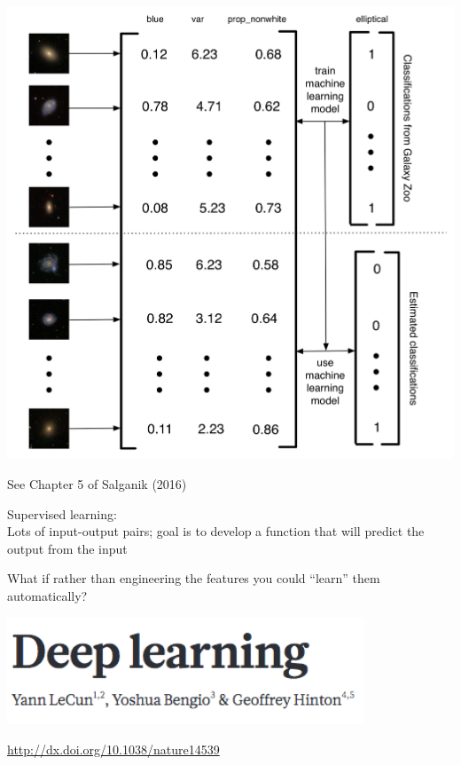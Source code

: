 \documentclass[aspectratio=169]{beamer}
\begin{document}
\begin{frame}

\begin{center}
\includegraphics[height=0.9\textheight]{figures/gz_banerji_schematic}
\end{center}
\vfill
See Chapter 5 of Salganik (2016)
\end{frame}
\begin{frame}

Supervised learning:\\
Lots of input-output pairs; goal is to develop a function that will predict the output from the input

\end{frame}
\begin{frame}

\Large{
\begin{center}
What if rather than engineering the features you could ``learn'' them automatically?
\end{center}
}
\end{frame}
\begin{frame}

\begin{center}
\includegraphics[width=0.8\textwidth]{figures/lecunn_deep_2015}
\end{center}
\vfill
\url{http://dx.doi.org/10.1038/nature14539}

\end{frame}
\end{document}
